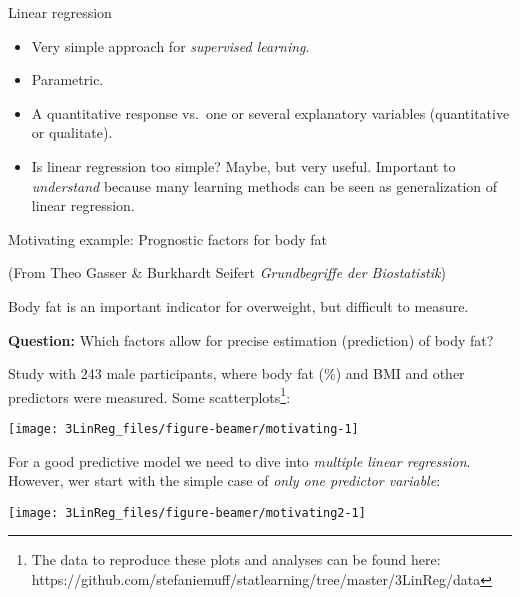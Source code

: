 \documentclass[10pt,ignorenonframetext,]{beamer}
\begin{document}
\begin{frame}{Linear regression}
\protect\hypertarget{linear-regression}{}

\begin{itemize}
\item
  Very simple approach for \emph{supervised learning}.
\item
  Parametric.
\item
  A quantitative response vs.~one or several explanatory variables
  (quantitative or qualitate).
\item
  Is linear regression too simple? Maybe, but very useful. Important to
  \emph{understand} because many learning methods can be seen as
  generalization of linear regression.
\end{itemize}

\end{frame}

\begin{frame}

\begin{block}{Motivating example: Prognostic factors for body fat}

\tiny(From Theo Gasser \& Burkhardt Seifert \emph{Grundbegriffe der
Biostatistik})

\vspace{2mm}
\normalsize

Body fat is an important indicator for overweight, but difficult to
measure.

\vspace{2mm}

\textbf{Question:} Which factors allow for precise estimation
(prediction) of body fat?

\vspace{2mm}

Study with 243 male participants, where body fat (\%) and BMI and other
predictors were measured. Some
scatterplots\footnote{The data to reproduce these plots and analyses can be found here: https://github.com/stefaniemuff/statlearning/tree/master/3LinReg/data}:

\begin{center}\texttt{[image: 3LinReg\_files/figure-beamer/motivating-1]} \end{center}

\end{block}

\end{frame}

\begin{frame}

For a good predictive model we need to dive into \emph{multiple linear
regression}. However, wer start with the simple case of \emph{only one
predictor variable}:

\begin{center}\texttt{[image: 3LinReg\_files/figure-beamer/motivating2-1]} \end{center}

\end{frame}
\end{document}
